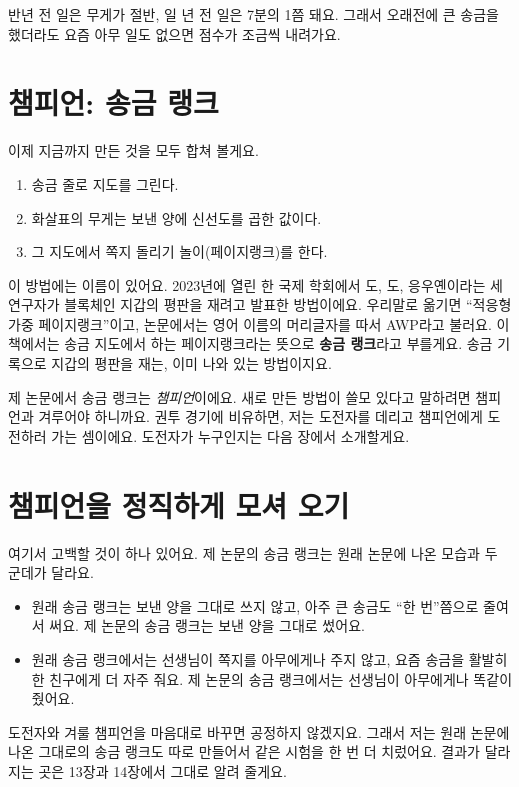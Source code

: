 반년 전 일은 무게가 절반, 일 년 전 일은 7분의 1쯤 돼요.
그래서 오래전에 큰 송금을 했더라도 요즘 아무 일도 없으면 점수가 조금씩 내려가요.

\section{챔피언: 송금 랭크}

이제 지금까지 만든 것을 모두 합쳐 볼게요.

\begin{enumerate}
\item 송금 줄로 지도를 그린다.
\item 화살표의 무게는 보낸 양에 신선도를 곱한 값이다.
\item 그 지도에서 쪽지 돌리기 놀이(페이지랭크)를 한다.
\end{enumerate}

이 방법에는 이름이 있어요.
2023년에 열린 한 국제 학회에서 도, 도, 응우옌이라는 세 연구자가 블록체인 지갑의 평판을 재려고 발표한 방법이에요.
우리말로 옮기면 “적응형 가중 페이지랭크”이고, 논문에서는 영어 이름의 머리글자를 따서 AWP라고 불러요.
이 책에서는 송금 지도에서 하는 페이지랭크라는 뜻으로 \textbf{송금 랭크}라고 부를게요.
송금 기록으로 지갑의 평판을 재는, 이미 나와 있는 방법이지요.

제 논문에서 송금 랭크는 \emph{챔피언}이에요.
새로 만든 방법이 쓸모 있다고 말하려면 챔피언과 겨루어야 하니까요.
권투 경기에 비유하면, 저는 도전자를 데리고 챔피언에게 도전하러 가는 셈이에요.
도전자가 누구인지는 다음 장에서 소개할게요.

\section{챔피언을 정직하게 모셔 오기}

여기서 고백할 것이 하나 있어요.
제 논문의 송금 랭크는 원래 논문에 나온 모습과 두 군데가 달라요.

\begin{itemize}
\item 원래 송금 랭크는 보낸 양을 그대로 쓰지 않고, 아주 큰 송금도 “한 번”쯤으로 줄여서 써요.
      제 논문의 송금 랭크는 보낸 양을 그대로 썼어요.
\item 원래 송금 랭크에서는 선생님이 쪽지를 아무에게나 주지 않고, 요즘 송금을 활발히 한 친구에게 더 자주 줘요.
      제 논문의 송금 랭크에서는 선생님이 아무에게나 똑같이 줬어요.
\end{itemize}

도전자와 겨룰 챔피언을 마음대로 바꾸면 공정하지 않겠지요.
그래서 저는 원래 논문에 나온 그대로의 송금 랭크도 따로 만들어서 같은 시험을 한 번 더 치렀어요.
결과가 달라지는 곳은 13장과 14장에서 그대로 알려 줄게요.

